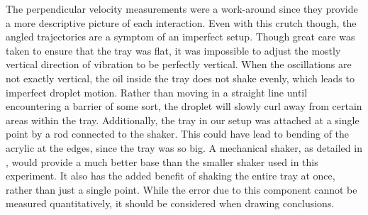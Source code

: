 The perpendicular velocity measurements were a work-around since they provide a more descriptive picture of each interaction. Even with this crutch though, the angled trajectories are a symptom of an imperfect setup. Though great care was taken to ensure that the tray was flat, it was impossible to adjust the mostly vertical direction of vibration to be perfectly vertical. When the oscillations are not exactly vertical, the oil inside the tray does not shake evenly, which leads to imperfect droplet motion. Rather than moving in a straight line until encountering a barrier of some sort, the droplet will slowly curl away from certain areas within the tray. Additionally, the tray in our setup was attached at a single point by a rod connected to the shaker. This could have lead to bending of the acrylic at the edges, since the tray was so big. A mechanical shaker, as detailed in , would provide a much better base than the smaller shaker used in this experiment. It also has the added benefit of shaking the entire tray at once, rather than just a single point. While the error due to this component cannot be measured quantitatively, it should be considered when drawing conclusions.




